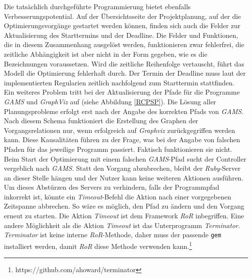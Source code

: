 \documentclass[a4paper,12pt,parskip,bibtotoc,liststotoc]{article}
\begin{document}
Die tatsächlich durchgeführte Programmierung bietet ebenfalls Verbesserungspotential. Auf der Übersichtsseite der Projektplanung, auf der die Optimierungsvorgänge gestartet werden können, finden sich auch die Felder zur Aktualisierung des Starttermins und der Deadline. Die Felder und Funktionen, die in diesem Zusammenhang ausgelöst werden, funktionieren zwar fehlerfrei, die zeitliche Abhängigkeit ist aber nicht in der Form gegeben, wie es die Bezeichnungen voraussetzen. Wird die zeitliche Reihenfolge vertauscht, führt das Modell die Optimierung fehlerhaft durch. Der Termin der Deadline muss laut der implementierten Regularien zeitlich nachfolgend zum Starttermin stattfinden. \\

Ein weiteres Problem tritt bei der Aktualisierung der Pfade für die Programme \textit{GAMS} und \textit{GraphViz} auf (siehe Abbildung \ref{RCPSP}). Die Lösung aller Planungsprobleme erfolgt erst nach der Angabe des korrekten Pfads von \textit{GAMS}. Nach diesem Schema funktioniert die Erstellung des Graphen der Vorgangsrelationen nur, wenn erfolgreich auf \textit{Graphviz} zurückgegriffen werden kann. Diese Kausalitäten führen zu der Frage, was bei der Angabe von falschen Pfaden für das jeweilige Programm passiert. Faktisch funktionieren sie nicht. Beim Start der Optimierung mit einem falschen \textit{GAMS}-Pfad sucht der Controller vergeblich nach \textit{GAMS}. Statt den Vorgang abzubrechen, bleibt der \textit{Ruby}-Server an dieser Stelle hängen und der Nutzer kann keine weiteren Aktionen ausführen. Um dieses \glqq Abstürzen\grqq\; des Servers zu verhindern, falls der Programmpfad inkorrekt ist, könnte ein \textit{Timeout}-Befehl die Aktion nach einer vorgegebenen Zeitspanne abbrechen. So wäre es möglich, den Pfad zu ändern und den Vorgang erneut zu starten. Die Aktion \textit{Timeout} ist dem Framework \textit{RoR} inbegriffen. Eine andere Möglichkeit als die Aktion \textit{Timeout} ist das Unterprogramm \textit{\glqq Terminator\grqq}. \textit{\glqq Terminator\grqq} ist keine interne \textit{RoR}-Methode, daher muss der passende \texttt{gem} installiert werden, damit \textit{RoR} diese Methode verwenden kann.\footnote{https://github.com/ahoward/terminator}\\
\end{document}
